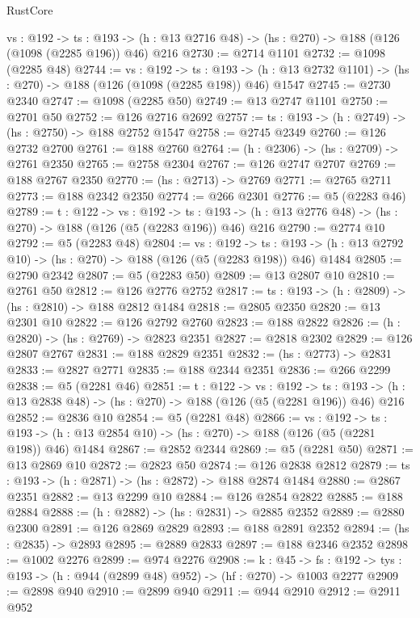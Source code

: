 \begin{lexlean}{RustCore}
\begin{coremodule}
  {vs : @192} ->
  {ts : @193} -> (h : @13 @2716 @48) -> (hs : @270) -> @188 (@126 (@1098 (@2285 @196)) @46) @216
@2730 := @2714 @1101
@2732 := @1098 (@2285 @48)
@2744 := {vs : @192} ->
  {ts : @193} -> (h : @13 @2732 @1101) -> (hs : @270) -> @188 (@126 (@1098 (@2285 @198)) @46) @1547
@2745 := @2730 @2340
@2747 := @1098 (@2285 @50)
@2749 := @13 @2747 @1101
@2750 := @2701 @50
@2752 := @126 @2716 @2692
@2757 := {ts : @193} -> (h : @2749) -> (hs : @2750) -> @188 @2752 @1547
@2758 := @2745 @2349
@2760 := @126 @2732 @2700
@2761 := @188 @2760
@2764 := (h : @2306) -> (hs : @2709) -> @2761 @2350
@2765 := @2758 @2304
@2767 := @126 @2747 @2707
@2769 := @188 @2767 @2350
@2770 := (hs : @2713) -> @2769
@2771 := @2765 @2711
@2773 := @188 @2342 @2350
@2774 := @266 @2301
@2776 := @5 (@2283 @46)
@2789 := {t : @122} ->
  {vs : @192} ->
  {ts : @193} -> (h : @13 @2776 @48) -> (hs : @270) -> @188 (@126 (@5 (@2283 @196)) @46) @216
@2790 := @2774 @10
@2792 := @5 (@2283 @48)
@2804 := {vs : @192} ->
  {ts : @193} -> (h : @13 @2792 @10) -> (hs : @270) -> @188 (@126 (@5 (@2283 @198)) @46) @1484
@2805 := @2790 @2342
@2807 := @5 (@2283 @50)
@2809 := @13 @2807 @10
@2810 := @2761 @50
@2812 := @126 @2776 @2752
@2817 := {ts : @193} -> (h : @2809) -> (hs : @2810) -> @188 @2812 @1484
@2818 := @2805 @2350
@2820 := @13 @2301 @10
@2822 := @126 @2792 @2760
@2823 := @188 @2822
@2826 := (h : @2820) -> (hs : @2769) -> @2823 @2351
@2827 := @2818 @2302
@2829 := @126 @2807 @2767
@2831 := @188 @2829 @2351
@2832 := (hs : @2773) -> @2831
@2833 := @2827 @2771
@2835 := @188 @2344 @2351
@2836 := @266 @2299
@2838 := @5 (@2281 @46)
@2851 := {t : @122} ->
  {vs : @192} ->
  {ts : @193} -> (h : @13 @2838 @48) -> (hs : @270) -> @188 (@126 (@5 (@2281 @196)) @46) @216
@2852 := @2836 @10
@2854 := @5 (@2281 @48)
@2866 := {vs : @192} ->
  {ts : @193} -> (h : @13 @2854 @10) -> (hs : @270) -> @188 (@126 (@5 (@2281 @198)) @46) @1484
@2867 := @2852 @2344
@2869 := @5 (@2281 @50)
@2871 := @13 @2869 @10
@2872 := @2823 @50
@2874 := @126 @2838 @2812
@2879 := {ts : @193} -> (h : @2871) -> (hs : @2872) -> @188 @2874 @1484
@2880 := @2867 @2351
@2882 := @13 @2299 @10
@2884 := @126 @2854 @2822
@2885 := @188 @2884
@2888 := (h : @2882) -> (hs : @2831) -> @2885 @2352
@2889 := @2880 @2300
@2891 := @126 @2869 @2829
@2893 := @188 @2891 @2352
@2894 := (hs : @2835) -> @2893
@2895 := @2889 @2833
@2897 := @188 @2346 @2352
@2898 := @1002 @2276
@2899 := @974 @2276
@2908 := {k : @45} ->
  {fs : @192} -> {tys : @193} -> (h : @944 (@2899 @48) @952) -> (hf : @270) -> @1003 @2277
@2909 := @2898 @940
@2910 := @2899 @940
@2911 := @944 @2910
@2912 := @2911 @952

\end{coremodule}
\end{lexlean}

